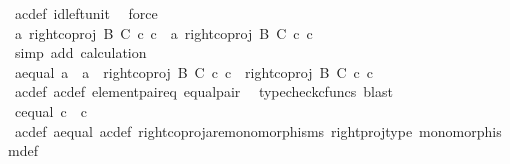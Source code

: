 \begin{isabellebody}
\ a{\isacharprime}{\kern0pt}c{\isacharprime}{\kern0pt}{\isacharunderscore}{\kern0pt}def\ id{\isacharunderscore}{\kern0pt}left{\isacharunderscore}{\kern0pt}unit{}\ \isamarkupfalse%
\ force\isanewline
\ \ \ \ \ \ \ \ \ \ \isamarkupfalse%
\ \isamarkupfalse%
\ {\isachardoublequoteopen}{\isasymlangle}a{\isacharcomma}{\kern0pt}\ right{\isacharunderscore}{\kern0pt}coproj\ B\ C\ {\isasymcirc}\isactrlsub c\ c{\isasymrangle}\ {\isacharequal}{\kern0pt}\ {\isasymlangle}a{\isacharprime}{\kern0pt}{\isacharcomma}{\kern0pt}\ right{\isacharunderscore}{\kern0pt}coproj\ B\ C\ {\isasymcirc}\isactrlsub c\ c{\isacharprime}{\kern0pt}{\isasymrangle}{\isachardoublequoteclose}\isanewline
\ \ \ \ \ \ \ \ \ \ \ \ \isamarkupfalse%
\ {\isacharparenleft}{\kern0pt}simp\ add{\isacharcolon}{\kern0pt}\ calculation{\isacharparenright}{\kern0pt}\isanewline
\ \ \ \ \ \ \ \ \isamarkupfalse%
\ \ \ \ \ \isanewline
\ \ \ \ \ \ \ \ \isamarkupfalse%
\ \isamarkupfalse%
\ a{\isacharunderscore}{\kern0pt}equal{\isacharcolon}{\kern0pt}\ {\isachardoublequoteopen}a\ {\isacharequal}{\kern0pt}\ a{\isacharprime}{\kern0pt}\ {\isasymand}\ right{\isacharunderscore}{\kern0pt}coproj\ B\ C\ {\isasymcirc}\isactrlsub c\ c\ {\isacharequal}{\kern0pt}\ right{\isacharunderscore}{\kern0pt}coproj\ B\ C\ {\isasymcirc}\isactrlsub c\ c{\isacharprime}{\kern0pt}{\isachardoublequoteclose}\isanewline
\ \ \ \ \ \ \ \ \ \ \isamarkupfalse%
\ a{\isacharprime}{\kern0pt}c{\isacharprime}{\kern0pt}{\isacharunderscore}{\kern0pt}def\ ac{\isacharunderscore}{\kern0pt}def\ element{\isacharunderscore}{\kern0pt}pair{\isacharunderscore}{\kern0pt}eq\ equal{\isacharunderscore}{\kern0pt}pair\ \isamarkupfalse%
\ {\isacharparenleft}{\kern0pt}typecheck{\isacharunderscore}{\kern0pt}cfuncs{\isacharcomma}{\kern0pt}\ blast{\isacharparenright}{\kern0pt}\isanewline
\ \ \ \ \ \ \ \ \isamarkupfalse%
\ \isamarkupfalse%
\ c{\isacharunderscore}{\kern0pt}equal{\isacharcolon}{\kern0pt}\ {\isachardoublequoteopen}c\ {\isacharequal}{\kern0pt}\ c{\isacharprime}{\kern0pt}{\isachardoublequoteclose}\ \isanewline
\ \ \ \ \ \ \ \ \ \ \isamarkupfalse%
\ a{\isacharprime}{\kern0pt}c{\isacharprime}{\kern0pt}{\isacharunderscore}{\kern0pt}def\ a{\isacharunderscore}{\kern0pt}equal\ ac{\isacharunderscore}{\kern0pt}def\ right{\isacharunderscore}{\kern0pt}coproj{\isacharunderscore}{\kern0pt}are{\isacharunderscore}{\kern0pt}monomorphisms\ right{\isacharunderscore}{\kern0pt}proj{\isacharunderscore}{\kern0pt}type\ monomorphism{\isacharunderscore}{\kern0pt}def{}\ \isamarkupfalse%

\end{isabellebody}
